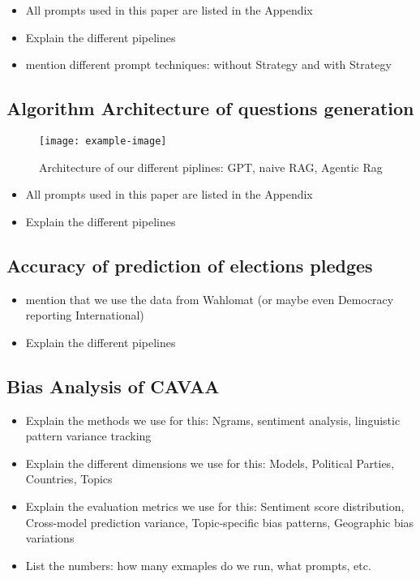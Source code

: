 \documentclass{article}
\begin{document}
\begin{itemize}
    \item All prompts used in this paper are listed in the Appendix
    \item Explain the different pipelines
    \item mention different prompt techniques: without Strategy and with Strategy
\end{itemize}





\subsection{Algorithm Architecture of questions generation }


\begin{figure}[H]
    \centering
    \texttt{[image: example-image]}
    \caption{Architecture of our different piplines: GPT, naive RAG, Agentic Rag}
    \label{fig:example2}
\end{figure}

\begin{itemize}
    \item All prompts used in this paper are listed in the Appendix
    \item Explain the different pipelines
\end{itemize}






\subsection{Accuracy of prediction of elections pledges}


\begin{itemize}
    \item mention that we use the data from Wahlomat (or maybe even Democracy reporting International)
    \item Explain the different pipelines
\end{itemize}




\subsection{Bias Analysis of CAVAA}


\begin{itemize}
    \item Explain the methods we use for this: Ngrams, sentiment analysis, linguistic pattern variance tracking
    \item Explain the different dimensions we use for this: Models, Political Parties, Countries, Topics
    \item Explain the evaluation metrics we use for this: Sentiment score distribution, Cross-model prediction variance, Topic-specific bias patterns, Geographic bias variations
    \item List the numbers: how many exmaples do we run, what prompts, etc.
\end{itemize}
\end{document}

